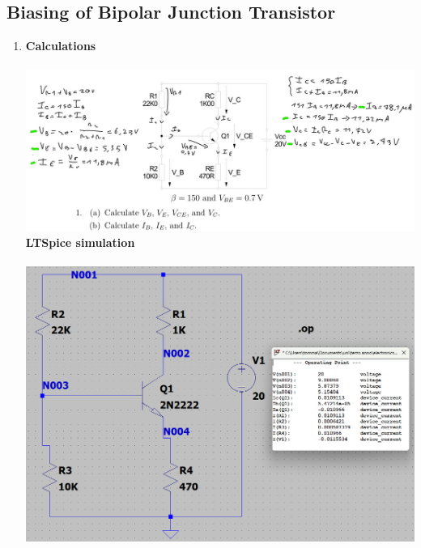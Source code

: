 \documentclass{article}
\begin{document}
	\subsection{Biasing of Bipolar Junction Transistor}
	\begin{enumerate}
		\item \textbf{Calculations}\\\\
		\includegraphics[scale=0.45]{prelab 3/prelab 3 ex 1 calc}\\
		\textbf{LTSpice simulation}\\\\
		\includegraphics[scale=0.6]{prelab 3/prelab 3 ex1 circuit}\\
	\end{enumerate}
	\pagebreak
\end{document}
